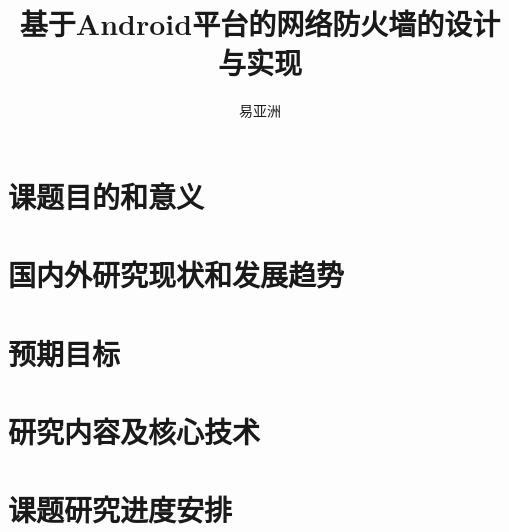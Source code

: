 \documentclass[language=chinese]{hustproposal}
\title{基于Android平台的网络防火墙的设计与实现}
\author{易亚洲}
\begin{document}
\maketitle

\section{课题目的和意义}
\section{国内外研究现状和发展趋势}
\section{预期目标}
\section{研究内容及核心技术}
\section{课题研究进度安排}



\nocite{*}

\end{document}
